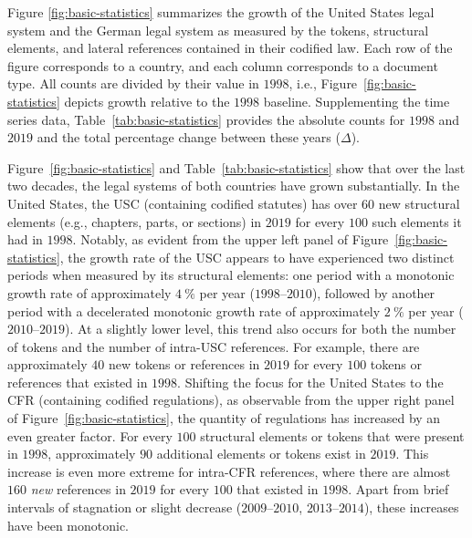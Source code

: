 \documentclass[utf8,sort&compress,table,hidelinks]{frontiersFPHY} %
\begin{document}
Figure \ref{fig:basic-statistics} summarizes the growth of the United States legal system and the German legal system as measured by the tokens, structural elements, and lateral references contained in their codified law. 
Each row of the figure corresponds to a country, and each column corresponds to a document type. 
All counts are divided by their value in $1998$, i.e., Figure~\ref{fig:basic-statistics} depicts growth relative to the $1998$ baseline.
Supplementing the time series data, 
Table~\ref{tab:basic-statistics} provides the absolute counts for $1998$ and $2019$ and the total percentage change between these years ($\Delta$).





Figure~\ref{fig:basic-statistics} and Table~\ref{tab:basic-statistics} show that over the last two decades, the legal systems of both countries have grown substantially.  
In the United States, the USC (containing codified statutes) has over $60$ new structural elements (e.g., chapters, parts, or sections) in $2019$ for every $100$ such elements it had in $1998$.
Notably, as evident from the upper left panel of Figure~\ref{fig:basic-statistics}, the growth rate of the USC appears to have experienced two distinct periods when measured by its structural elements: 
one period with a monotonic growth rate of approximately $4~\%$ per year ($1998$--$2010$), followed by another period with a decelerated monotonic growth rate of approximately $2~\%$ per year ($2010$--$2019$). 
At a slightly lower level, this trend also occurs for both the number of tokens and the number of intra-USC references. 
For example, there are approximately $40$ new tokens or references in $2019$ for every $100$ tokens or references that existed in $1998$.
Shifting the focus for the United States to the CFR (containing codified regulations), as observable from the upper right panel of Figure~\ref{fig:basic-statistics}, the quantity of regulations has increased by an even greater factor.  
For every $100$ structural elements or tokens that were present in $1998$, approximately $90$ additional elements or tokens exist in $2019$. 
This increase is even more extreme for intra-CFR references, where there are almost $160$ \emph{new} references in $2019$ for every $100$ that existed in $1998$.  
Apart from brief intervals of stagnation or slight decrease ($2009$--$2010$, $2013$--$2014$), 
these increases have been monotonic.
\end{document}
